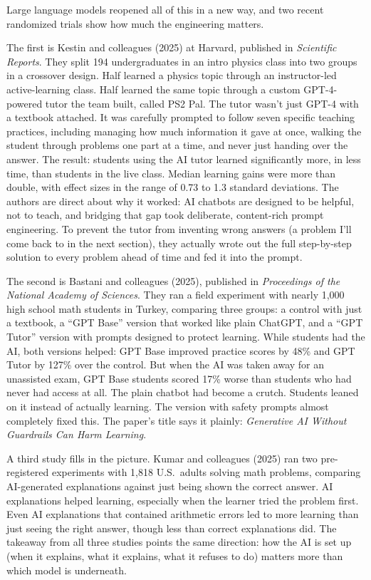\documentclass[11pt,letterpaper]{article}
\begin{document}
Large language models reopened all of this in a new way, and two recent
randomized trials show how much the engineering matters.

The first is Kestin and colleagues (2025) at Harvard, published in
\textit{Scientific Reports}. They split 194 undergraduates in an intro physics
class into two groups in a crossover design. Half learned a physics topic
through an instructor-led active-learning class. Half learned the same topic
through a custom GPT-4-powered tutor the team built, called PS2 Pal. The tutor
wasn't just GPT-4 with a textbook attached. It was carefully prompted to
follow seven specific teaching practices, including managing how much
information it gave at once, walking the student through problems one part at
a time, and never just handing over the answer. The result: students using the
AI tutor learned significantly more, in less time, than students in the live
class. Median learning gains were more than double, with effect sizes in the
range of 0.73 to 1.3 standard deviations. The authors are direct about why it
worked: AI chatbots are designed to be helpful, not to teach, and bridging
that gap took deliberate, content-rich prompt engineering. To prevent the
tutor from inventing wrong answers (a problem I'll come back to in the next
section), they actually wrote out the full step-by-step solution to every
problem ahead of time and fed it into the prompt.

The second is Bastani and colleagues (2025), published in \textit{Proceedings
of the National Academy of Sciences}. They ran a field experiment with nearly
1,000 high school math students in Turkey, comparing three groups: a control
with just a textbook, a ``GPT Base'' version that worked like plain ChatGPT,
and a ``GPT Tutor'' version with prompts designed to protect learning. While
students had the AI, both versions helped: GPT Base improved practice scores
by 48\% and GPT Tutor by 127\% over the control. But when the AI was taken
away for an unassisted exam, GPT Base students scored 17\% worse than students
who had never had access at all. The plain chatbot had become a
crutch. Students leaned on it instead of actually learning. The version with
safety prompts almost completely fixed this. The paper's title says it plainly:
\textit{Generative AI Without Guardrails Can Harm Learning}.

A third study fills in the picture. Kumar and colleagues (2025) ran two
pre-registered experiments with 1,818 U.S.\ adults solving math problems,
comparing AI-generated explanations against just being shown the correct
answer. AI explanations helped learning, especially when the learner tried
the problem first. Even AI explanations that contained arithmetic errors led
to more learning than just seeing the right answer, though less than correct
explanations did. The takeaway from all three studies points the same
direction: how the AI is set up (when it explains, what it explains, what
it refuses to do) matters more than which model is underneath.
\end{document}
